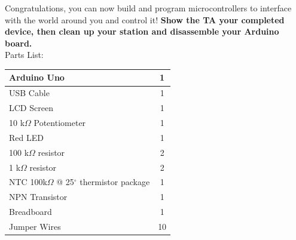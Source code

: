 \documentclass[12pt]{article}
\begin{document}
Congratulations, you can now build and program microcontrollers 
to interface with the world around you and control it!
{\bf Show the TA your completed device, then clean up your station and disassemble your Arduino board.}\\

\bigskip
\noindent Parts List:\\[0.4em]
\begin{tabular}{|l|c|}
\hline
Arduino Uno & 1 \\ \hline
USB Cable & 1 \\ \hline
LCD Screen & 1 \\ \hline
10 k$\Omega$ Potentiometer & 1 \\ \hline
Red LED & 1 \\ \hline
100 k$\Omega$ resistor & 2 \\ \hline
1 k$\Omega$ resistor & 2 \\ \hline
NTC 100k$\Omega$ @ 25$^{\circ}$ thermistor package & 1 \\ \hline
NPN Transistor & 1 \\ \hline
Breadboard & 1 \\ \hline
Jumper Wires & 10 \\ \hline
\end{tabular}
\end{document}
